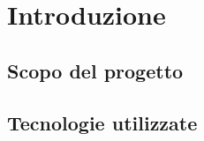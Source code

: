 \documentclass[../main.tex]{subfiles}
\begin{document}
\chapter{Introduzione}\label{c:introduzione}
\section{Scopo del progetto}\label{s:scopo-progetto}

\section{Tecnologie utilizzate}\label{s:teconologie-utilizzate}
\end{document}
